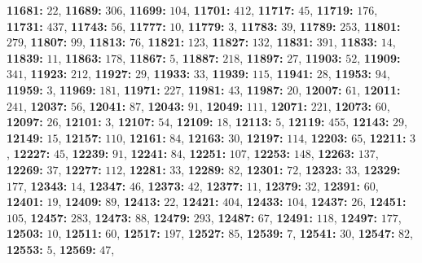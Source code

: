 \textsf{\bfseries 11681:} $22$, \textsf{\bfseries 11689:} $306$, \textsf{\bfseries 11699:} $104$, \textsf{\bfseries 11701:} $412$, \textsf{\bfseries 11717:} $45$, \textsf{\bfseries 11719:} $176$, \textsf{\bfseries 11731:} $437$, \textsf{\bfseries 11743:} $56$, \textsf{\bfseries 11777:} $10$, \textsf{\bfseries 11779:} $3$, \textsf{\bfseries 11783:} $39$, \textsf{\bfseries 11789:} $253$, \textsf{\bfseries 11801:} $279$, \textsf{\bfseries 11807:} $99$, \textsf{\bfseries 11813:} $76$, \textsf{\bfseries 11821:} $123$, \textsf{\bfseries 11827:} $132$, \textsf{\bfseries 11831:} $391$, \textsf{\bfseries 11833:} $14$, \textsf{\bfseries 11839:} $11$, \textsf{\bfseries 11863:} $178$, \textsf{\bfseries 11867:} $5$, \textsf{\bfseries 11887:} $218$, \textsf{\bfseries 11897:} $27$, \textsf{\bfseries 11903:} $52$, \textsf{\bfseries 11909:} $341$, \textsf{\bfseries 11923:} $212$, \textsf{\bfseries 11927:} $29$, \textsf{\bfseries 11933:} $33$, \textsf{\bfseries 11939:} $115$, \textsf{\bfseries 11941:} $28$, \textsf{\bfseries 11953:} $94$, \textsf{\bfseries 11959:} $3$, \textsf{\bfseries 11969:} $181$, \textsf{\bfseries 11971:} $227$, \textsf{\bfseries 11981:} $43$, \textsf{\bfseries 11987:} $20$, \textsf{\bfseries 12007:} $61$, \textsf{\bfseries 12011:} $241$, \textsf{\bfseries 12037:} $56$, \textsf{\bfseries 12041:} $87$, \textsf{\bfseries 12043:} $91$, \textsf{\bfseries 12049:} $111$, \textsf{\bfseries 12071:} $221$, \textsf{\bfseries 12073:} $60$, \textsf{\bfseries 12097:} $26$, \textsf{\bfseries 12101:} $3$, \textsf{\bfseries 12107:} $54$, \textsf{\bfseries 12109:} $18$, \textsf{\bfseries 12113:} $5$, \textsf{\bfseries 12119:} $455$, \textsf{\bfseries 12143:} $29$, \textsf{\bfseries 12149:} $15$, \textsf{\bfseries 12157:} $110$, \textsf{\bfseries 12161:} $84$, \textsf{\bfseries 12163:} $30$, \textsf{\bfseries 12197:} $114$, \textsf{\bfseries 12203:} $65$, \textsf{\bfseries 12211:} $3$, \textsf{\bfseries 12227:} $45$, \textsf{\bfseries 12239:} $91$, \textsf{\bfseries 12241:} $84$, \textsf{\bfseries 12251:} $107$, \textsf{\bfseries 12253:} $148$, \textsf{\bfseries 12263:} $137$, \textsf{\bfseries 12269:} $37$, \textsf{\bfseries 12277:} $112$, \textsf{\bfseries 12281:} $33$, \textsf{\bfseries 12289:} $82$, \textsf{\bfseries 12301:} $72$, \textsf{\bfseries 12323:} $33$, \textsf{\bfseries 12329:} $177$, \textsf{\bfseries 12343:} $14$, \textsf{\bfseries 12347:} $46$, \textsf{\bfseries 12373:} $42$, \textsf{\bfseries 12377:} $11$, \textsf{\bfseries 12379:} $32$, \textsf{\bfseries 12391:} $60$, \textsf{\bfseries 12401:} $19$, \textsf{\bfseries 12409:} $89$, \textsf{\bfseries 12413:} $22$, \textsf{\bfseries 12421:} $404$, \textsf{\bfseries 12433:} $104$, \textsf{\bfseries 12437:} $26$, \textsf{\bfseries 12451:} $105$, \textsf{\bfseries 12457:} $283$, \textsf{\bfseries 12473:} $88$, \textsf{\bfseries 12479:} $293$, \textsf{\bfseries 12487:} $67$, \textsf{\bfseries 12491:} $118$, \textsf{\bfseries 12497:} $177$, \textsf{\bfseries 12503:} $10$, \textsf{\bfseries 12511:} $60$, \textsf{\bfseries 12517:} $197$, \textsf{\bfseries 12527:} $85$, \textsf{\bfseries 12539:} $7$, \textsf{\bfseries 12541:} $30$, \textsf{\bfseries 12547:} $82$, \textsf{\bfseries 12553:} $5$, \textsf{\bfseries 12569:} $47$, 
